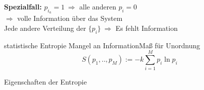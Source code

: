 \textbf{Spezialfall:} $p_{i_{a}} = 1 \ \Rightarrow$ alle anderen $p_i = 0 $ \\
$\Rightarrow$  volle Information über das System \\
Jede andere Verteilung der $\{ p_i \} \ \Rightarrow$ Es fehlt Information

\begin{definition}{statistische Entropie \glqq Mangel an Information\grqq \glqq Maß für Unordnung\grqq}
    \begin{equation}
        S (p_1, .., p_M) := -k \sum_{i=1}^M p_i \ln{p_i}
    \end{equation}
\end{definition}

\begin{prop}{Eigenschaften der Entropie}
    


\end{prop}
